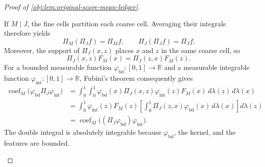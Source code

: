 \begin{proof}[Proof of \cref{obj:lem:original-score-mean-ledger}]
\begin{enumerate}
If \(M\mid J\), the fine cells partition each coarse cell. Averaging their integrals therefore yields
\[
\Pi_M(\Pi_Jf)=\Pi_Mf,
\qquad
\Pi_J(\Pi_Jf)=\Pi_Jf.
\]
Moreover, the support of \(\Pi_J(x,z)\) places \(x\) and \(z\) in the same coarse cell, so
\[
\Pi_J(x,z)F_M(x)=\Pi_J(z,x)F_M(z).
\]
For a bounded measurable function \(\varphi_{\mathrm{bd}}:[0,1]\to\mathbb R\) and a measurable integrable function \(\varphi_{\mathrm{int}}:[0,1]\to\mathbb R\), Fubini's theorem consequently gives
\[
\begin{aligned}
\operatorname{coef}_M\bigl(\varphi_{\mathrm{bd}}\Pi_J\varphi_{\mathrm{int}}\bigr)
&=\int_0^1\int_0^1
\varphi_{\mathrm{bd}}(x)\Pi_J(x,z)\varphi_{\mathrm{int}}(z)F_M(x)\,d\lambda(z)\,d\lambda(x)\\
&=\int_0^1 \varphi_{\mathrm{int}}(z)F_M(z)
\left[\int_0^1\Pi_J(z,x)\varphi_{\mathrm{bd}}(x)\,d\lambda(x)\right]d\lambda(z)\\
&=\operatorname{coef}_M\bigl((\Pi_J\varphi_{\mathrm{bd}})\varphi_{\mathrm{int}}\bigr).
\end{aligned}
\]
The double integral is absolutely integrable because \(\varphi_{\mathrm{bd}}\), the kernel, and the features are bounded.


\end{enumerate}
\end{proof}
